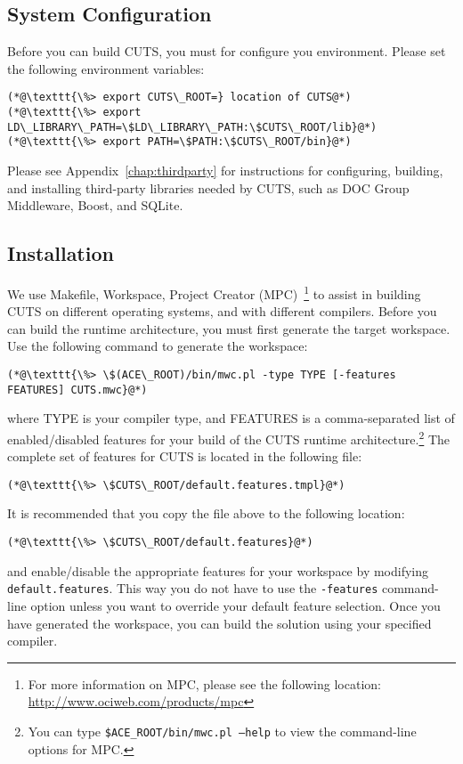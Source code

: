 \subsection{System Configuration}

Before you can build CUTS, you must for configure you environment. Please
set the following environment variables:
\begin{lstlisting}
(*@\texttt{\%> export CUTS\_ROOT=} location of CUTS@*)
(*@\texttt{\%> export LD\_LIBRARY\_PATH=\$LD\_LIBRARY\_PATH:\$CUTS\_ROOT/lib}@*)
(*@\texttt{\%> export PATH=\$PATH:\$CUTS\_ROOT/bin}@*)
\end{lstlisting}
Please see Appendix~\ref{chap:thirdparty} for instructions for configuring,
building, and installing third-party libraries needed by CUTS, such as 
DOC Group Middleware, Boost, and SQLite.

\subsection{Installation}

We use Makefile, Workspace, Project Creator (MPC)~\footnote{For more information
on MPC, please see the following location: \url{http://www.ociweb.com/products/mpc}}
to assist in building CUTS
on different operating systems, and with different compilers. Before you can
build the runtime architecture, you must first generate the target workspace.
Use the following command to generate the workspace:
\begin{lstlisting}
(*@\texttt{\%> \$(ACE\_ROOT)/bin/mwc.pl -type TYPE [-features FEATURES] CUTS.mwc}@*)
\end{lstlisting}
where TYPE is your compiler type, and FEATURES is a comma-separated list of 
enabled/disabled features
for your build of the CUTS runtime architecture.\footnote{You can type 
\texttt{\$ACE\_ROOT/bin/mwc.pl --help} to view the command-line options for 
MPC.} The complete set of features for CUTS is located in the following
file:
\begin{lstlisting}
(*@\texttt{\%> \$CUTS\_ROOT/default.features.tmpl}@*)
\end{lstlisting}
It is recommended that you copy the file above to the following location:
\begin{lstlisting}
(*@\texttt{\%> \$CUTS\_ROOT/default.features}@*)
\end{lstlisting}
and enable/disable the appropriate features for your workspace by 
modifying \texttt{default.features}. This way you do not have to use 
the \texttt{-features} command-line option unless you want
to override your default feature selection. Once you have generated 
the workspace, you can build the solution using your specified compiler.

